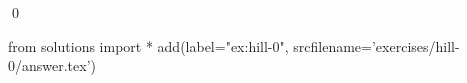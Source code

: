 
\begin{ex} 
  \label{ex:hill-0}
  
  \qed
\end{ex} 
\begin{python0}
from solutions import *
add(label="ex:hill-0",
    srcfilename='exercises/hill-0/answer.tex') 
\end{python0}
